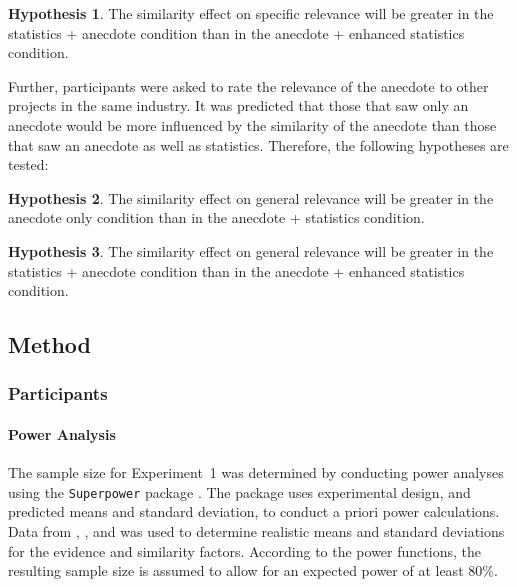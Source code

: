 \documentclass[a4paper, nobind]{templates/ociamthesis}
\theoremstyle{definition}
\theoremstyle{definition}
\theoremstyle{definition}
\theoremstyle{definition}
\newtheorem{hypothesis}{Hypothesis}[chapter]
\theoremstyle{remark}
\begin{document}
\begin{hypothesis}
\protect\hypertarget{hyp:relevance-specific-enhanced-anecdotes-1}{}{\label{hyp:relevance-specific-enhanced-anecdotes-1} }The similarity effect on specific relevance will be greater in the statistics +
anecdote condition than in the anecdote + enhanced statistics condition.
\end{hypothesis}

Further, participants were asked to rate the relevance of the anecdote to other
projects in the same industry. It was predicted that those that saw only an anecdote
would be more influenced by the similarity of the anecdote than those that saw
an anecdote as well as statistics. Therefore, the following hypotheses are
tested:

\begin{hypothesis}
\protect\hypertarget{hyp:relevance-general-anecdotes-1}{}{\label{hyp:relevance-general-anecdotes-1} }The similarity effect on general relevance will be greater in the anecdote only
condition than in the anecdote + statistics condition.
\end{hypothesis}

\begin{hypothesis}
\protect\hypertarget{hyp:relevance-general-enhanced-anecdotes-1}{}{\label{hyp:relevance-general-enhanced-anecdotes-1} }The similarity effect on general relevance will be greater in the statistics +
anecdote condition than in the anecdote + enhanced statistics condition.
\end{hypothesis}

\hypertarget{method-anecdotes-1-appendix}{%
\subsection{Method}\label{method-anecdotes-1-appendix}}

\subsubsection{Participants}

\hypertarget{power-analysis-anecdotes-1}{%
\paragraph{Power Analysis}\label{power-analysis-anecdotes-1}}

The sample size for Experiment~1 was determined by conducting power analyses
using the \texttt{Superpower} package \autocite{lakens2019}. The package uses experimental
design, and predicted means and standard deviation, to conduct a priori power
calculations. Data from \textcite{wainberg2018}, \textcite{jaramillo2019}, and \textcite[Study~3]{hoeken2009}
was used to determine realistic means and standard deviations for the evidence
and similarity factors. According to the power functions, the resulting sample
size is assumed to allow for an expected power of at least 80\%.
\end{document}
